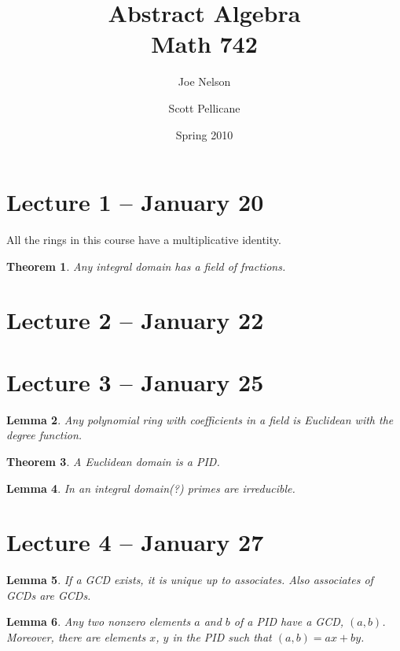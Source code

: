 \documentclass[letterpaper]{article}
\newtheorem{theorem}{Theorem}[section]
\newtheorem{lemma}[theorem]{Lemma}
\begin{document}
\title{Abstract Algebra\\
Math 742}
\author{Joe Nelson \and Scott Pellicane}
\date{Spring 2010}
\maketitle

\section{Lecture 1 -- January 20}

All the rings in this course have a multiplicative identity.

\begin{theorem}
Any integral domain has a field of fractions.
\end{theorem}

\section{Lecture 2 -- January 22}

\section{Lecture 3 -- January 25}

\begin{lemma}
Any polynomial ring with coefficients in a field is Euclidean with the degree function.
\end{lemma}

\begin{theorem}
A Euclidean domain is a PID.
\end{theorem}

\begin{lemma}
In an integral domain(?) primes are irreducible.
\end{lemma}

\section{Lecture 4 -- January 27}

\begin{lemma}
If a GCD exists, it is unique up to associates. Also associates of GCDs are GCDs.
\end{lemma}

\begin{lemma}
Any two nonzero elements $a$ and $b$ of a PID have a GCD, $(a, b)$. Moreover, there are elements $x$, $y$ in the PID such that $(a, b) = ax + by$. 
\end{lemma}
\end{document}
